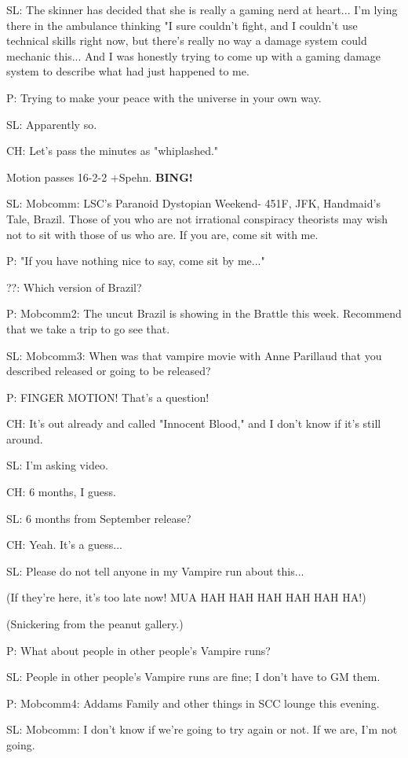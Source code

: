 \documentclass[12pt]{article}
\newcommand{\bing}{{\bf BING!} }
\begin{document}
SL: The skinner has decided that she is really a gaming nerd at heart... I'm lying there in the ambulance thinking "I sure couldn't fight, and I couldn't use technical skills right now, but there's really no way a damage system could mechanic this... And I was honestly trying to come up with a gaming damage system to describe what had just happened to me.

P: Trying to make your peace with the universe in your own way.

SL: Apparently so.

CH: Let's pass the minutes as "whiplashed."

Motion passes 16-2-2 +Spehn. \bing

SL: Mobcomm: LSC's Paranoid Dystopian Weekend- 451F, JFK, Handmaid's Tale, Brazil. Those of you who are not irrational conspiracy theorists may wish not to sit with those of us who are. If you are, come sit with me.

P: "If you have nothing nice to say, come sit by me..."

??: Which version of Brazil?

P: Mobcomm2: The uncut Brazil is showing in the Brattle this week. Recommend that we take a trip to go see that.

SL: Mobcomm3: When was that vampire movie with Anne Parillaud that you described released or going to be released?

P: FINGER MOTION! That's a question!

CH: It's out already and called "Innocent Blood," and I don't know if it's still around.

SL: I'm asking video.

CH: 6 months, I guess.

SL: 6 months from September release?

CH: Yeah. It's a guess...

SL: Please do not tell anyone in my Vampire run about this...

(If they're here, it's too late now! MUA HAH HAH HAH HAH HAH HA!)

(Snickering from the peanut gallery.)

P: What about people in other people's Vampire runs?

SL: People in other people's Vampire runs are fine; I don't have to GM them.

P: Mobcomm4: Addams Family and other things in SCC lounge this evening.

SL: Mobcomm: I don't know if we're going to try again or not. If we are, I'm not going.
\end{document}
